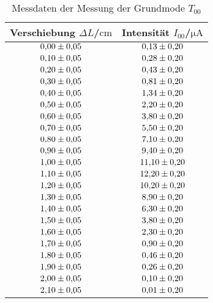 \begin{table}
 \caption{Messdaten der Messung der Grundmode $T_{00}$}
 \label{tab:t00}
 \centering
{} \begin{tabular}{SS}
 \toprule 
    {Verschiebung $\Delta L$/$\si{\centi\meter}$}& {Intensität $I_{\mathrm{00}}$/$\si{\micro\ampere}$} \\
     \midrule
     $\num{0.00 \pm 0.05}$ & $\num{0.13\pm0.20}$ \\
     $\num{0.10 \pm 0.05}$ & $\num{0.28\pm0.20}$ \\
     $\num{0.20 \pm 0.05}$ & $\num{0.43\pm0.20}$ \\
     $\num{0.30 \pm 0.05}$ & $\num{0.81\pm0.20}$ \\
     $\num{0.40 \pm 0.05}$ & $\num{1.34\pm0.20}$ \\
     $\num{0.50 \pm 0.05}$ & $\num{2.20\pm0.20}$ \\
     $\num{0.60 \pm 0.05}$ & $\num{3.80\pm0.20}$ \\
     $\num{0.70 \pm 0.05}$ & $\num{5.50\pm0.20}$ \\
     $\num{0.80 \pm 0.05}$ & $\num{7.10\pm0.20}$ \\
     $\num{0.90 \pm 0.05}$ & $\num{9.40\pm0.20}$ \\
     $\num{1.00 \pm 0.05}$ & $\num{11.10\pm0.20}$ \\
     $\num{1.10 \pm 0.05}$ & $\num{12.20\pm0.20}$ \\
     $\num{1.20 \pm 0.05}$ & $\num{10.20\pm0.20}$ \\
     $\num{1.30 \pm 0.05}$ & $\num{8.90\pm0.20}$ \\
     $\num{1.40 \pm 0.05}$ & $\num{6.30\pm0.20}$ \\
     $\num{1.50 \pm 0.05}$ & $\num{3.80\pm0.20}$ \\
     $\num{1.60 \pm 0.05}$ & $\num{2.30\pm0.20}$ \\
     $\num{1.70 \pm 0.05}$ & $\num{0.90\pm0.20}$ \\
     $\num{1.80 \pm 0.05}$ & $\num{0.46\pm0.20}$ \\
     $\num{1.90 \pm 0.05}$ & $\num{0.26\pm0.20}$ \\
     $\num{2.00 \pm 0.05}$ & $\num{0.10\pm0.20}$ \\
     $\num{2.10 \pm 0.05}$ & $\num{0.01\pm0.20}$ \\
 \bottomrule
 \end{tabular}
\end{table}